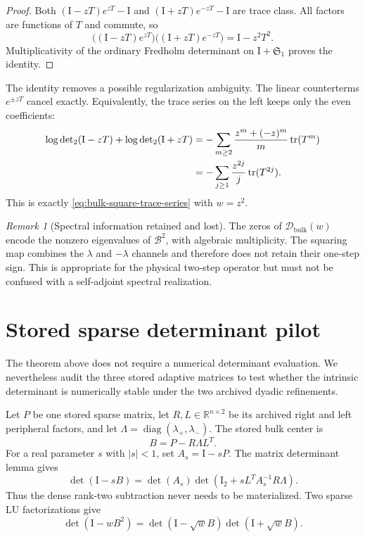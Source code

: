 \documentclass[11pt]{article}
\theoremstyle{definition}
\theoremstyle{remark}
\newtheorem{remark}[theorem]{Remark}
\newcommand{\R}{\mathbb R}
\newcommand{\Id}{\mathrm I}
\newcommand{\cB}{\mathcal B}
\newcommand{\cD}{\mathcal D}
\newcommand{\tr}{\operatorname{tr}}
\newcommand{\Dettwo}{\operatorname{det}\nolimits_2}
\begin{document}
\begin{proof}
Both $(\Id-zT)e^{zT}-\Id$ and
$(\Id+zT)e^{-zT}-\Id$ are trace class.  All factors are functions of $T$
and commute, so
\[
 \bigl((\Id-zT)e^{zT}\bigr)
 \bigl((\Id+zT)e^{-zT}\bigr)
 =\Id-z^2T^2.
\]
Multiplicativity of the ordinary Fredholm determinant on
$\Id+\mathfrak S_1$ proves the identity.
\end{proof}

The identity removes a possible regularization ambiguity.  The linear
counterterms $e^{\pm zT}$ cancel exactly.  Equivalently, the trace series on
the left keeps only the even coefficients:
\begin{align}
 \log\Dettwo(\Id-zT)+\log\Dettwo(\Id+zT)
 &=-\sum_{m\ge2}\frac{z^m+(-z)^m}{m}\tr(T^m)
 \notag\\
 &=-\sum_{j\ge1}\frac{z^{2j}}{j}\tr(T^{2j}).
 \label{eq:even-det2-series}
\end{align}
This is exactly \eqref{eq:bulk-square-trace-series} with $w=z^2$.

\begin{remark}[Spectral information retained and lost]
The zeros of $\cD_{\mathrm{bulk}}(w)$ encode the nonzero eigenvalues of
$\cB^2$, with algebraic multiplicity.  The squaring map combines the
$\lambda$ and $-\lambda$ channels and therefore does not retain their
one-step sign.  This is appropriate for the physical two-step operator but
must not be confused with a self-adjoint spectral realization.
\end{remark}

\section{Stored sparse determinant pilot}
\label{sec:pilot}

The theorem above does not require a numerical determinant evaluation.  We
nevertheless audit the three stored adaptive matrices to test whether the
intrinsic determinant is numerically stable under the two archived dyadic
refinements.

Let $P$ be one stored sparse matrix, let
$R,L\in\R^{n\times2}$ be its archived right and left peripheral factors,
and let $\Lambda=\operatorname{diag}(\lambda_+,\lambda_-)$.  The stored
bulk center is
\begin{equation}
 B=P-R\Lambda L^T.
 \label{eq:stored-bulk}
\end{equation}
For a real parameter $s$ with $|s|<1$, set $A_s=\Id-sP$.  The matrix
determinant lemma gives
\begin{equation}
 \det(\Id-sB)
 =\det(A_s)
 \det\!\left(\Id_2+sL^TA_s^{-1}R\Lambda\right).
 \label{eq:determinant-lemma}
\end{equation}
Thus the dense rank-two subtraction never needs to be materialized.  Two
sparse LU factorizations give
\begin{equation}
 \det(\Id-wB^2)
 =\det(\Id-\sqrt w B)\det(\Id+\sqrt w B).
 \label{eq:pilot-symmetric-product}
\end{equation}
\end{document}
